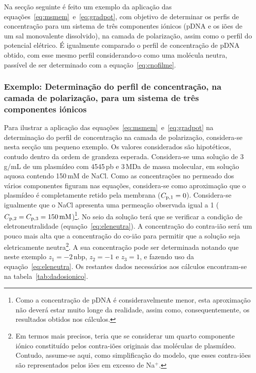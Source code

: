 Na secção seguinte é feito um exemplo da aplicação das equações~\ref{eq:msmem}~e~\ref{eq:gradpot}, com objetivo de determinar os perfis de concentração para um sistema de três componentes iónicos (pDNA e os iões de um sal monovalente dissolvido), na camada de polarização, assim como o perfil do potencial elétrico. 
%
É igualmente comparado o perfil de concentração de pDNA obtido, com esse mesmo perfil considerando-o como uma molécula neutra, passível de ser determinado com a equação~\ref{eq:cnofilme}.

\subsubsection*{Exemplo: Determinação do perfil de concentração, na camada de polarização, para um sistema de três componentes iónicos}
Para ilustrar a aplicação das equações~\ref{eq:msmem}~e~\ref{eq:gradpot} na determinação do perfil de concentração na camada de polarização, considera-se nesta secção um pequeno exemplo. Os valores considerados são hipotéticos, contudo dentro da ordem de grandeza esperada. Considera-se uma solução de 3\,\micro g/mL de um plasmídeo com 4545\,pb e 3\,MDa de massa molecular, em solução aquosa contendo 150\,mM de NaCl. Como as concentrações no permeado dos vários componentes figuram nas equações, considera-se como aproximação que o plasmídeo é completamente retido pela membrana ($C_{\mathrm{p,1}}=0$). Considera-se igualmente que o NaCl apresenta uma permeação observada igual a 1 ($C_{\mathrm{p,2}}=C_{\mathrm{p,3}}=150\,\mathrm{mM}$)\footnote{Como a concentração de pDNA é consideravelmente menor, esta aproximação não deverá estar muito longe da realidade, assim como, consequentemente, os resultados obtidos nos cálculos.}.
No seio da solução terá que se verificar a condição de eletroneutralidade (equação~\ref{eq:eleneutra}).
A concentração do contra-ião será um pouco mais alta que a concentração do co-ião para permitir que a solução seja eletricamente neutra\footnote{Em termos mais precisos, teria que se considerar um quarto componente iónico constituído pelos contra-iões originais das moléculas de plasmídeo. Contudo, assume-se aqui, como simplificação do modelo, que esses contra-iões são representados pelos iões em excesso de Na$^{+}$.}. A sua concentração pode ser determinada notando que neste exemplo $z_1=-2\,\mathrm{nbp}$, $z_2=-1$ e $z_3=1$, e fazendo uso da equação~\ref{eq:eleneutra}. Os restantes dados necessários aos cálculos encontram-se na tabela~\ref{tab:dadosionico}.

